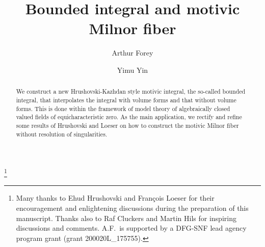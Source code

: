 \documentclass[12pt]{amsart}
\theoremstyle{plain}
\theoremstyle{definition}
\theoremstyle{remark}
\numberwithin{equation}{section}
\theoremstyle{plain}
\newcommand{\0}{\emptyset}
\begin{document}
\title[Bounded integral and motivic Milnor fiber]{Bounded integral and motivic Milnor fiber}

\author[Arthur Forey]{Arthur Forey}
\address[A. Forey]{D-MATH, ETH Z\"urich, R\"amistrasse 101, CH-8092 Z\"urich, Switzerland}

\author[Yimu Yin]{Yimu Yin}
\address[Y. Yin]{Pasadena, California}

\thanks{Many thanks to Ehud Hrushovski and Fran\c cois Loeser for their encouragement and enlightening discussions during the preparation of this manuscript. Thanks also to Raf Cluckers and Martin Hils for inspiring discussions and comments. A.F.\ is supported by a DFG-SNF lead agency program grant
  (grant 200020L\_175755). }



\begin{abstract}
We construct a new Hrushovski-Kazhdan style motivic integral, the so-called bounded integral, that interpolates the integral with volume forms and that without volume forms. This is done within the framework of model theory of algebraically closed valued fields of equicharacteristic zero. As the main application, we rectify and refine some results of Hrushovski and Loeser on how to construct the motivic Milnor fiber without resolution of singularities.
\end{abstract}


\maketitle
\tableofcontents
\end{document}
